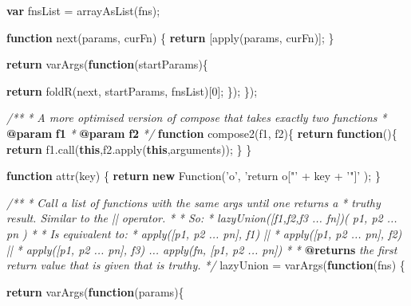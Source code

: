 \documentclass[12pt, ]{article}
\newenvironment{Shaded}{}{}
\newcommand{\KeywordTok}[1]{\textcolor[rgb]{0.00,0.44,0.13}{\textbf{{#1}}}}
\newcommand{\DecValTok}[1]{\textcolor[rgb]{0.25,0.63,0.44}{{#1}}}
\newcommand{\StringTok}[1]{\textcolor[rgb]{0.25,0.44,0.63}{{#1}}}
\newcommand{\CommentTok}[1]{\textcolor[rgb]{0.38,0.63,0.69}{\textit{{#1}}}}
\newcommand{\OtherTok}[1]{\textcolor[rgb]{0.00,0.44,0.13}{{#1}}}
\newcommand{\FunctionTok}[1]{\textcolor[rgb]{0.02,0.16,0.49}{{#1}}}
\newcommand{\NormalTok}[1]{{#1}}
\begin{document}
\begin{Shaded}
\begin{Highlighting}[]
      \KeywordTok{var} \NormalTok{fnsList = }\FunctionTok{arrayAsList}\NormalTok{(fns);}
   
      \KeywordTok{function} \FunctionTok{next}\NormalTok{(params, curFn) \{  }
         \KeywordTok{return} \NormalTok{[}\FunctionTok{apply}\NormalTok{(params, curFn)];   }
      \NormalTok{\}}
            
      \KeywordTok{return} \FunctionTok{varArgs}\NormalTok{(}\KeywordTok{function}\NormalTok{(startParams)\{}
        
         \KeywordTok{return} \FunctionTok{foldR}\NormalTok{(next, startParams, fnsList)[}\DecValTok{0}\NormalTok{];}
      \NormalTok{\});}
   \NormalTok{\});}

\CommentTok{/**}
\CommentTok{ * A more optimised version of compose that takes exactly two functions}
\CommentTok{ * }\KeywordTok{@param}\CommentTok{ }\KeywordTok{f1}
\CommentTok{ * }\KeywordTok{@param}\CommentTok{ }\KeywordTok{f2}
\CommentTok{ */}
\KeywordTok{function} \FunctionTok{compose2}\NormalTok{(f1, f2)\{}
   \KeywordTok{return} \KeywordTok{function}\NormalTok{()\{}
      \KeywordTok{return} \OtherTok{f1}\NormalTok{.}\FunctionTok{call}\NormalTok{(}\KeywordTok{this}\NormalTok{,}\OtherTok{f2}\NormalTok{.}\FunctionTok{apply}\NormalTok{(}\KeywordTok{this}\NormalTok{,arguments));}
   \NormalTok{\}}
\NormalTok{\}}


\KeywordTok{function} \FunctionTok{attr}\NormalTok{(key) \{}
   \KeywordTok{return} \KeywordTok{new} \FunctionTok{Function}\NormalTok{(}\StringTok{'o'}\NormalTok{, }\StringTok{'return o["'} \NormalTok{+ key + }\StringTok{'"]'} \NormalTok{);}
\NormalTok{\}}
        
\CommentTok{/**}
\CommentTok{ * Call a list of functions with the same args until one returns a }
\CommentTok{ * truthy result. Similar to the || operator.}
\CommentTok{ * }
\CommentTok{ * So:}
\CommentTok{ *      lazyUnion([f1,f2,f3 ... fn])( p1, p2 ... pn )}
\CommentTok{ *      }
\CommentTok{ * Is equivalent to: }
\CommentTok{ *      apply([p1, p2 ... pn], f1) || }
\CommentTok{ *      apply([p1, p2 ... pn], f2) || }
\CommentTok{ *      apply([p1, p2 ... pn], f3) ... apply(fn, [p1, p2 ... pn])  }
\CommentTok{ *  }
\CommentTok{ * }\KeywordTok{@returns}\CommentTok{ the first return value that is given that is truthy.}
\CommentTok{ */}
   \NormalTok{lazyUnion = }\FunctionTok{varArgs}\NormalTok{(}\KeywordTok{function}\NormalTok{(fns) \{}

      \KeywordTok{return} \FunctionTok{varArgs}\NormalTok{(}\KeywordTok{function}\NormalTok{(params)\{}
   

\end{Highlighting}
\end{Shaded}
\end{document}
